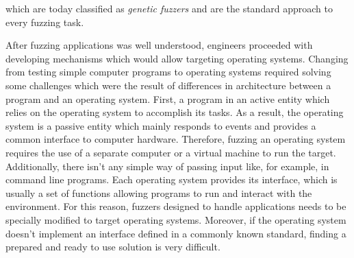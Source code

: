 which are today classified as \textit{genetic fuzzers} and are the standard approach to every fuzzing task. 

After fuzzing applications was well understood, engineers proceeded with developing mechanisms which would allow targeting operating systems. Changing from testing simple computer programs to operating systems required solving some challenges which were the result of differences in architecture between a program and an operating system. First, a program in an active entity which relies on the operating system to accomplish its tasks. As a result, the operating system is a passive entity which mainly responds to events and provides a common interface to computer hardware. Therefore, fuzzing an operating system requires the use of a separate computer or a virtual machine to run the target. Additionally, there isn't any simple way of passing input like, for example, in command line programs. Each operating system provides its interface, which is usually a set of functions allowing programs to run and interact with the environment. For this reason, fuzzers designed to handle applications needs to be specially modified to target operating systems. Moreover, if the operating system doesn't implement an interface defined in a commonly known standard, finding a prepared and ready to use solution is very difficult.

